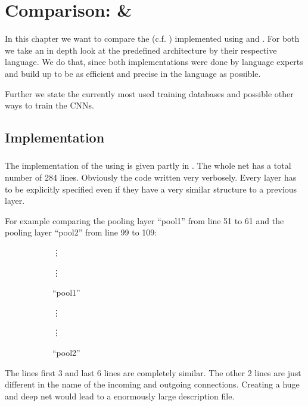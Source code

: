\chapter{Comparison: \cnnarch \& \caffe}

In this chapter we want to compare the \alexnet (c.f. ) implemented using \cnnarch and \caffe. For both we take an in depth look at the predefined architecture by their respective language. We do that, since both implementations were done by language experts and build up to be as efficient and precise in the language as possible.

Further we state the currently most used training databases and possible other ways to train the CNNs. 


\section{Implementation} \label{sec: Implementation}

\subsection{\caffe} \label{subsec: Caffe Implementation}
The implementation of the \alexnet using \caffe is given partly in . The whole net has a total number of 284 lines. Obviously the code written very verbosely. Every layer has to be explicitly specified even if they have a very similar structure to a previous layer.

\newpage  %
For example comparing the pooling layer ``pool1'' from line 51 to 61 and the pooling layer ``pool2'' from line 99 to 109:
\begin{figure}[H]
	\centering
	\begin{subfigure}[b]{0.45\textwidth}
		\hspace*{2cm}\vdots
		
		\hspace*{2cm}\vdots
		\caption{``pool1''}
		\label{lst: pool1}
	\end{subfigure}
	\begin{subfigure}[b]{0.45\textwidth}
		\hspace*{2cm}\vdots
		
		\hspace*{2cm}\vdots
		\caption{``pool2''}
		\label{lst: pool2}
	\end{subfigure}
	\caption{}
	\label{lst: pool1 and pool2}
\end{figure}
The lines first 3 and last 6 lines are completely similar. The other 2 lines are just different in the name of the incoming and outgoing connections. Creating a huge and deep net would lead to a enormously large description file. 

